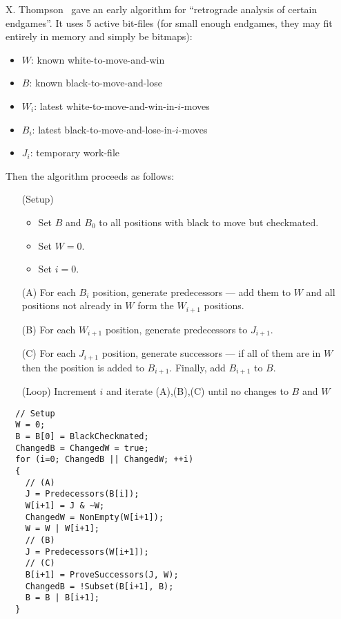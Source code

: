 \documentclass[10pt,dvipdfmx]{report}
\begin{document}
X. Thompson~\cite{thompson:endgame} gave an early algorithm for
``retrograde analysis of certain endgames''.  It uses 5 active bit-files (for small enough endgames,
they may fit entirely in memory and simply be bitmaps):
\begin{itemize}
  \item $W$: known white-to-move-and-win
  \item $B$: known black-to-move-and-lose
  \item $W_i$: latest white-to-move-and-win-in-$i$-moves
  \item $B_i$: latest black-to-move-and-lose-in-$i$-moves
  \item $J_i$: temporary work-file
\end{itemize}
Then the algorithm proceeds as follows:
\begin{itemize}
  \item[(Setup)]
    \begin{itemize}
      \item Set $B$ and $B_0$ to all positions with black to move but checkmated.
      \item Set $W=0$.
      \item Set $i=0$.
    \end{itemize}
  \item[(A)] For each $B_i$ position, generate predecessors --- add them to $W$
    and all positions not already in $W$ form the $W_{i+1}$ positions.
  \item[(B)] For each $W_{i+1}$ position, generate predecessors to $J_{i+1}$.
  \item[(C)] For each $J_{i+1}$ position, generate successors --- if all of them
    are in $W$ then the position is added to $B_{i+1}$.
    Finally, add $B_{i+1}$ to $B$.
  \item[(Loop)] Increment $i$ and iterate (A),(B),(C) until no changes to $B$ and $W$
\end{itemize}
\begin{verbatim}
  // Setup
  W = 0;
  B = B[0] = BlackCheckmated;
  ChangedB = ChangedW = true;
  for (i=0; ChangedB || ChangedW; ++i)
  {
    // (A)
    J = Predecessors(B[i]);
    W[i+1] = J & ~W;
    ChangedW = NonEmpty(W[i+1]);
    W = W | W[i+1];
    // (B)
    J = Predecessors(W[i+1]);
    // (C)
    B[i+1] = ProveSuccessors(J, W);
    ChangedB = !Subset(B[i+1], B);
    B = B | B[i+1];
  }
\end{verbatim}
\end{document}
